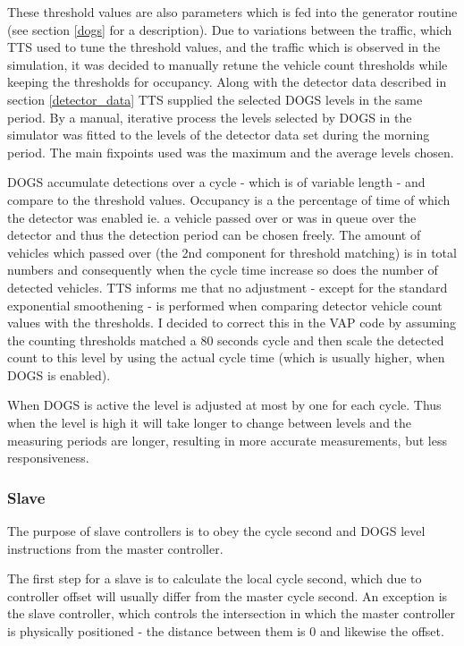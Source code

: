 These threshold values are also parameters which is fed into the generator routine (see section \ref{dogs} for a description). 
Due to variations between the traffic, which TTS used to tune the threshold values, and the traffic which is observed in the simulation, it was decided to manually retune the vehicle count thresholds while keeping the thresholds for occupancy. 
Along with the detector data described in section \ref{detector_data} TTS supplied the selected DOGS levels in the same period. By a manual, iterative process the levels selected by DOGS in the simulator was fitted to the levels of the detector data set during the morning period. The main fixpoints used was the maximum and the average levels chosen.

DOGS accumulate detections over a cycle - which is of variable length - and compare to the threshold values. Occupancy is a the percentage of time of which the detector was enabled ie. a vehicle passed over or was in queue over the detector and thus the detection period can be chosen freely. The amount of vehicles which passed over (the 2nd component for threshold matching) is in total numbers and consequently when the cycle time increase so does the number of detected vehicles. TTS informs me that no adjustment - except for the standard exponential smoothening - is performed when comparing detector vehicle count values with the thresholds. I decided to correct this in the VAP code by assuming the counting thresholds matched a 80 seconds cycle and then scale the detected count to this level by using the actual cycle time (which is usually higher, when DOGS is enabled).

When DOGS is active the level is adjusted at most by one for each cycle. Thus when the level is high it will take longer to change between levels and the measuring periods are longer, resulting in more accurate measurements, but less responsiveness.

\subsubsection{Slave}
The purpose of slave controllers is to obey the cycle second and DOGS level instructions from the master controller.

The first step for a slave is to calculate the local cycle second, which due to controller offset will usually differ from the master cycle second. An exception is the slave controller, which controls the intersection in which the master controller is physically positioned - the distance between them is 0 and likewise the offset.

